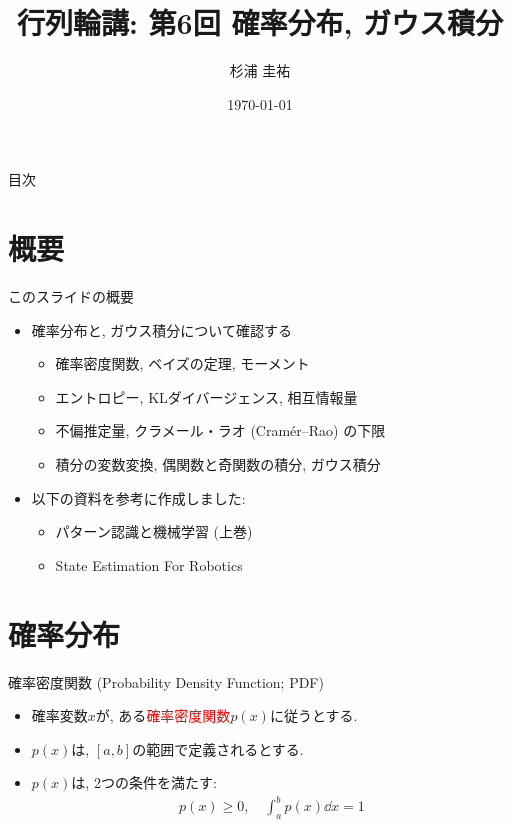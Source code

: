 \documentclass[dvipdfmx,notheorems,t]{beamer}
\title{行列輪講: 第6回 確率分布, ガウス積分}
\author{杉浦 圭祐}
\institute[松谷研究室]{慶應義塾大学理工学部情報工学科 松谷研究室}
\date{\today}
\begin{document}
\linespread{1.1}

\frame{\titlepage}

\section{}

\begin{frame}{目次}
\tableofcontents
\end{frame}

\section{概要}

\begin{frame}{このスライドの概要}
\begin{itemize}
  \item 確率分布と, ガウス積分について確認する
  \begin{itemize}
    \item 確率密度関数, ベイズの定理, モーメント
    \item エントロピー, KLダイバージェンス, 相互情報量
    \item 不偏推定量, クラメール・ラオ (Cramér--Rao) の下限
    \item 積分の変数変換, 偶関数と奇関数の積分, ガウス積分
  \end{itemize}
  \item 以下の資料を参考に作成しました:
  \begin{itemize}
    \item パターン認識と機械学習 (上巻)
    \item State Estimation For Robotics
  \end{itemize}
\end{itemize}
\end{frame}

\section{確率分布}

\begin{frame}{確率密度関数 (Probability Density Function; PDF)}
\begin{itemize}
  \item 確率変数$x$が, ある\textcolor{red}{確率密度関数}$p(x)$に従うとする.
  \item $p(x)$は, $[a, b]$の範囲で定義されるとする.
  \item $p(x)$は, 2つの条件を満たす:
  \begin{align*}
    p(x) \ge 0, \quad \int_a^b p(x) \dd{x} = 1
  \end{align*}
\end{itemize}
\end{frame}
\end{document}
